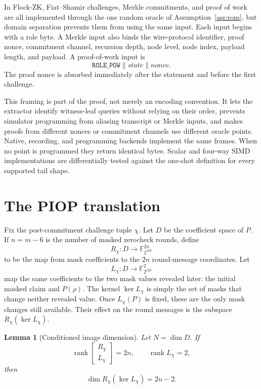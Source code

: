 \documentclass[11pt]{article}
\newtheorem{lemma}{Lemma}
\theoremstyle{definition}
\newcommand{\F}{\mathbb{F}}
\newcommand{\K}{\F_{2^{128}}}
\newcommand{\rank}{\operatorname{rank}}
\begin{document}
In Flock-ZK, Fiat--Shamir challenges, Merkle commitments, and proof of work are
all implemented through the one random oracle of Assumption~\ref{ass:rom}, but
domain separation prevents them from using the same input.  Each input begins
with a role byte.  A Merkle input also binds
the wire-protocol identifier, proof nonce, commitment channel, recursion depth, node
level, node index, payload length, and payload.  A proof-of-work input is
\[
  \texttt{ROLE\_POW}\parallel\textit{state}\parallel\textit{nonce}.
\]
The proof nonce is absorbed immediately after the statement and before the
first challenge.

This framing is part of the proof, not merely an encoding convention.  It lets
the extractor identify witness-leaf queries without relying on their order,
prevents simulator programming from aliasing transcript or Merkle inputs, and
makes proofs from different nonces or commitment channels use different
oracle points.  Native, recording, and programming backends implement the same
frames.  When no point is programmed they return identical bytes.  Scalar and
four-way SIMD implementations are differentially tested against the one-shot
definition for every supported tail shape.

\section{The PIOP translation}\label{sec:s2}

Fix the post-commitment challenge tuple $\chi$.  Let $D$ be the coefficient
space of $P$.  If $n=m-6$ is the number of masked zerocheck rounds, define
\[
  R_\chi:D\longrightarrow\K^{2n}
\]
to be the map from mask coefficients to the $2n$ round-message coordinates.
Let
\[
  L_\chi:D\longrightarrow\K^2
\]
map the same coefficients to the two mask values revealed later: the initial
masked claim and $P(\rho)$.  The kernel $\ker L_\chi$ is simply the set of
masks that change neither revealed value.  Once $L_\chi(P)$ is fixed, these are
the only mask changes still available.  Their effect on the round messages is
the subspace $R_\chi(\ker L_\chi)$.

\begin{lemma}[Conditioned image dimension]\label{lem:conditioned-image}
Let $N=\dim D$.  If
\[
  \rank\!\begin{bmatrix}R_\chi\\L_\chi\end{bmatrix}=2n,
  \qquad
  \rank L_\chi=2,
\]
then
\[
  \dim R_\chi(\ker L_\chi)=2n-2.
\]
\end{lemma}
\end{document}
